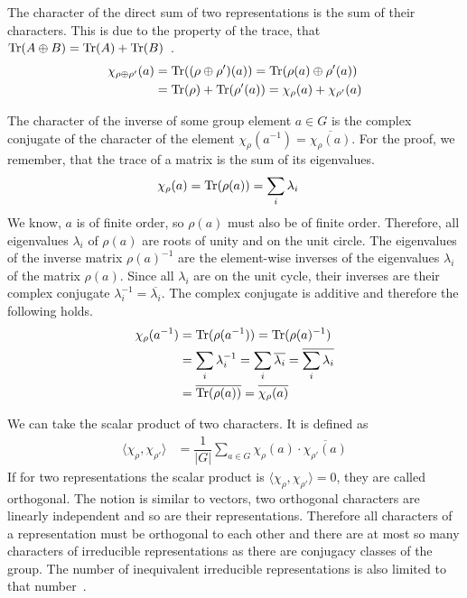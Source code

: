 The character of the direct sum of two representations is the sum of their characters.
This is due to the property of the trace, that $\operatorname{Tr}(A \oplus B) = \operatorname{Tr}(A) + \operatorname{Tr}(B)$~\cite{fulton2013}.
\begin{subequations}
\begin{align}
    \chi_{\rho \oplus \rho'}(a) & = \operatorname{Tr}((\rho \oplus \rho')(a)) = \operatorname{Tr}(\rho(a) \oplus \rho'(a)) \\
    & = \operatorname{Tr}(\rho) + \operatorname{Tr}(\rho'(a)) = \chi_\rho(a) + \chi_{\rho'}(a)
\end{align}
\end{subequations}

The character of the inverse of some group element $a \in G$ is the complex conjugate of the character of the element $\chi_\rho(a^{-1}) = \overline{\chi_\rho(a)}$.
For the proof, we remember, that the trace of a matrix is the sum of its eigenvalues.
\begin{align}
    \chi_\rho(a) & = \operatorname{Tr}(\rho(a)) = \sum_i \lambda_i
\end{align}
We know, $a$ is of finite order, so $\rho(a)$ must also be of finite order.
Therefore, all eigenvalues $\lambda_i$ of $\rho(a)$ are roots of unity and on the unit circle.
The eigenvalues of the inverse matrix $\rho(a)^{-1}$ are the element-wise inverses of the eigenvalues $\lambda_i$ of the matrix $\rho(a)$.
Since all $\lambda_i$ are on the unit cycle, their inverses are their complex conjugate $\lambda_i^{-1} = \overline{\lambda_i}$.
The complex conjugate is additive and therefore the following holds.
\begin{subequations}
\begin{align}
    \chi_\rho(a^{-1}) & = \operatorname{Tr}(\rho(a^{-1})) = \operatorname{Tr}(\rho(a)^{-1}) \\
    & = \sum_i \lambda_i^{-1} = \sum_i \overline{\lambda_i} = \overline{\sum_i \lambda_i} \\
    & = \overline{\operatorname{Tr}(\rho(a))} = \overline{\chi_\rho(a)}
\end{align}
\end{subequations}

We can take the scalar product of two characters.
It is defined as
\begin{align}
    \langle \chi_\rho, \chi_{\rho'} \rangle & = \dfrac{1}{|G|} \sum_{a \in G} \chi_\rho(a) \cdot \overline{\chi_{\rho'}(a)}
\end{align}
If for two representations the scalar product is $\langle \chi_\rho, \chi_{\rho'} \rangle = 0$, they are called orthogonal.
The notion is similar to vectors, two orthogonal characters are linearly independent and so are their representations.
Therefore all characters of a representation must be orthogonal to each other and there are at most so many characters of irreducible representations as there are conjugacy classes of the group.
The number of inequivalent irreducible representations is also limited to that number~\cite{fulton2013}.

